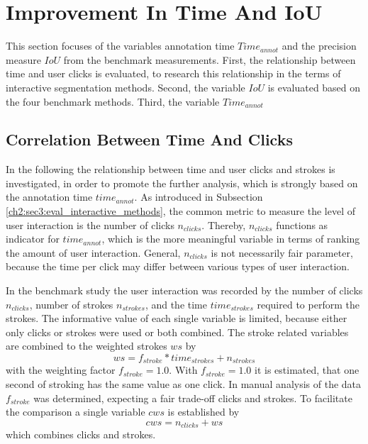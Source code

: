
\section{Improvement In Time And IoU}\label{ord:ch5:sec1}

This section focuses of the variables annotation time $Time_{annot}$ and the precision measure $IoU$ from the benchmark measurements.
First, the relationship between time and user clicks is evaluated, to research this relationship in the terms of interactive segmentation methods.
Second, the variable $IoU$ is evaluated based on the four benchmark methods.
Third, the variable $Time_{annot}$ 


\subsection{Correlation Between Time And Clicks}\label{ord:ch5:sec1:subsec1}

In the following the relationship between time and user clicks and strokes is investigated, in order to promote the further analysis, which is strongly based on the annotation time $time_{annot}$. 
As introduced in Subsection \ref{ch2:sec3:eval_interactive_methods}, the common metric to measure the level of user interaction is the number of clicks $n_{clicks}$.
Thereby, $n_{clicks}$ functions as indicator for $time_{annot}$, which is the more meaningful variable in terms of ranking the amount of user interaction.
General, $n_{clicks}$ is not necessarily fair parameter, because the time per click may differ between various types of user interaction.

In the benchmark study the user interaction was recorded by the number of clicks $n_{clicks}$, number of strokes $n_{strokes}$, and the time $time_{strokes}$ required to perform the strokes.
The informative value of each single variable is limited, because either only clicks or strokes were used or both combined.
The stroke related variables are combined to the weighted strokes $ws$ by
\begin{equation} \label{equ:ws}
	ws = f_{stroke} * time_{strokes} + n_{strokes} 
\end{equation}
with the weighting factor $f_{stroke}=1.0$.
With $f_{stroke}=1.0$ it is estimated, that one second of stroking has the same value as one click.
In manual analysis of the data $f_{stroke}$ was determined, expecting a fair trade-off clicks and strokes.
To facilitate the comparison a single variable $cws$ is established by 
\begin{equation}
	cws = n_{clicks} + ws
\end{equation}
which combines clicks and strokes.

